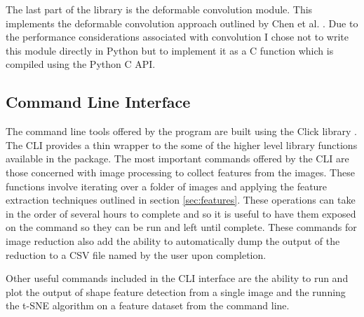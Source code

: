 The last part of the library is the deformable convolution module. This implements the deformable convolution approach outlined by Chen et al. \cite{chen2013multiscale}. Due to the performance considerations associated with convolution I chose not to write this module directly in Python but to implement it as a C function which is compiled using the Python C API.

\subsection{Command Line Interface}
The command line tools offered by the program are built using the Click library \cite{clickLibrary}. The CLI provides a thin wrapper to the some of the higher level library functions available in the package. The most important commands offered by the CLI are those concerned with image processing to collect features from the images. These functions involve iterating over a folder of images and applying the feature extraction techniques outlined in section  \ref{sec:features}. These operations can take in the order of several hours to complete and so it is useful to have them exposed on the command so they can be run and left until complete. These commands for image reduction also add the ability to automatically dump the output of the reduction to a CSV file named by the user upon completion. 

Other useful commands included in the CLI interface are the ability to run and plot the output of shape feature detection from a single image and the running the t-SNE algorithm on a feature dataset from the command line.




